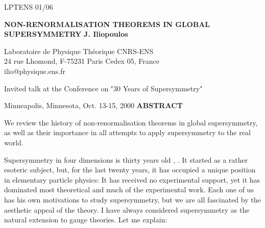 \documentclass[a4paper,11pt]{article}
\begin{document}
\thispagestyle{empty}

\begin{flushright} LPTENS 01/06 \end{flushright}
\vspace*{0.5cm}

\begin{center}{\bf { NON-RENORMALISATION THEOREMS IN GLOBAL SUPERSYMMETRY}}
\vskip1cm
{\bf{J. Iliopoulos}}
\vskip0.2cm

Laboratoire de Physique Th\'eorique CNRS-ENS\\
24 rue Lhomond, F-75231 Paris Cedex 05, France\\
ilio@physique.ens.fr

\vspace{0.5cm}
Invited talk at the Conference on "30 Years of Supersymmetry"

Minneapolis, Minnesota, Oct. 13-15, 2000
\vskip3.0cm
{\bf ABSTRACT}
\bigskip

We review the history of non-renormalisation theorems in global supersymmetry, 
as well as their importance in all attempts to apply supersymmetry to the real world.

\bigskip

\end{center}
\newpage

Supersymmetry in four dimensions is thirty years 
old \cite{old}, 
\cite{WZI}. It started as a rather esoteric subject, but, for the last twenty years, 
it has  occupied a unique position in elementary particle physics: It has received 
no experimental support, yet it has dominated most theoretical and much of the 
experimental work. Each one of us has his own motivations to study supersymmetry, 
but we are all fascinated by the aesthetic appeal of the theory. I have always 
considered supersymmetry as the natural extension to gauge theories. Let me explain:
\end{document}
